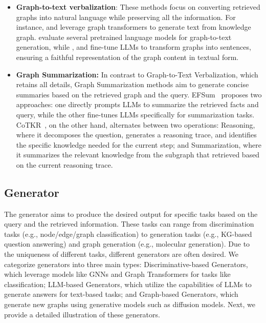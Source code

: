 \begin{itemize}[leftmargin=*]
    \item \textbf{Graph-to-text verbalization}: These methods focus on converting retrieved graphs into natural language while preserving all the information. For instance, \citet{koncel2019text} and \citet{wang2020amr} leverage graph transformers to generate text from knowledge graph. \citet{ribeiro2020investigating} evaluate several pretrained language models for graph-to-text generation, while \citet{wu2023retrieve}, and \citet{agarwal2020knowledge} fine-tune LLMs to transform graphs into sentences, ensuring a faithful representation of the graph content in textual form. 
    
    \item \textbf{Graph Summarization:}  In contrast to Graph-to-Text Verbalization, which retains all details, Graph Summarization methods aim to generate concise summaries based on the retrieved graph and the query. EFSum~\cite{ko2024evidence} proposes two approaches: one directly prompts LLMs to summarize the retrieved facts and query, while the other fine-tunes LLMs specifically for summarization tasks. CoTKR~\cite{wu2024cotkr}, on the other hand, alternates between two operations: Reasoning, where it decomposes the question, generates a reasoning trace, and identifies the specific knowledge needed for the current step; and Summarization, where it summarizes the relevant knowledge from the subgraph that retrieved based on the current reasoning trace.
\end{itemize}


\subsection{Generator}
\label{sec:generator}

The generator aims to produce the desired output for specific tasks based on the query and the retrieved information. These tasks can range from discrimination tasks (e.g., node/edge/graph classification) to generation tasks (e.g., KG-based question answering) and graph generation (e.g., molecular generation). Due to the uniqueness of different tasks, different generators are often desired. We categorize generators into three main types:  Discriminative-based Generators, which leverage models like GNNs and Graph Transformers for tasks like classification; LLM-based Generators, which utilize the capabilities of LLMs to generate answers for text-based tasks; and Graph-based Generators, which generate new graphs using generative models such as diffusion models. Next, we provide a detailed illustration of these generators.

